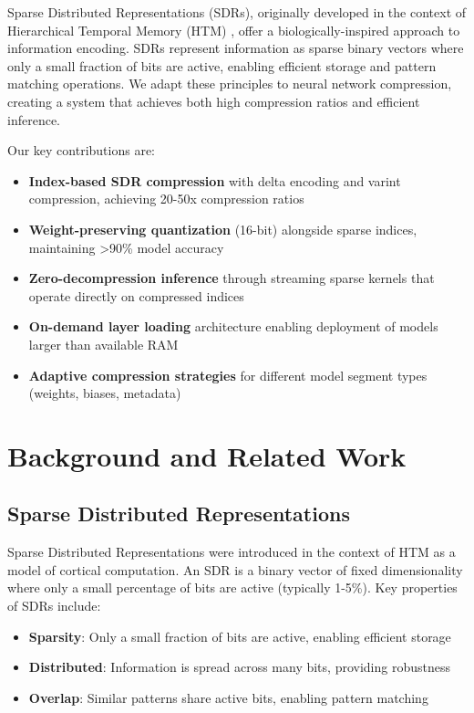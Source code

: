 \documentclass[11pt]{article}
\begin{document}
Sparse Distributed Representations (SDRs), originally developed in the context of Hierarchical Temporal Memory (HTM) \cite{hawkins2004hierarchical,hawkins2011cortical}, offer a biologically-inspired approach to information encoding. SDRs represent information as sparse binary vectors where only a small fraction of bits are active, enabling efficient storage and pattern matching operations. We adapt these principles to neural network compression, creating a system that achieves both high compression ratios and efficient inference.

Our key contributions are:

\begin{itemize}
    \item \textbf{Index-based SDR compression} with delta encoding and varint compression, achieving 20-50x compression ratios
    \item \textbf{Weight-preserving quantization} (16-bit) alongside sparse indices, maintaining >90\% model accuracy
    \item \textbf{Zero-decompression inference} through streaming sparse kernels that operate directly on compressed indices
    \item \textbf{On-demand layer loading} architecture enabling deployment of models larger than available RAM
    \item \textbf{Adaptive compression strategies} for different model segment types (weights, biases, metadata)
\end{itemize}

\section{Background and Related Work}

\subsection{Sparse Distributed Representations}

Sparse Distributed Representations were introduced in the context of HTM \cite{hawkins2004hierarchical} as a model of cortical computation. An SDR is a binary vector of fixed dimensionality where only a small percentage of bits are active (typically 1-5\%). Key properties of SDRs include:

\begin{itemize}
    \item \textbf{Sparsity}: Only a small fraction of bits are active, enabling efficient storage
    \item \textbf{Distributed}: Information is spread across many bits, providing robustness
    \item \textbf{Overlap}: Similar patterns share active bits, enabling pattern matching
\end{itemize}
\end{document}

